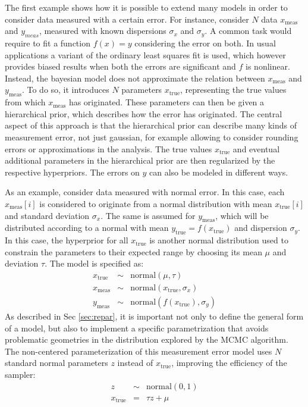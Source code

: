 The first example shows how it is possible to extend many models in order to consider data measured with a certain
error. For instance, consider $N$ data \(x_{\text{meas}}\) and $y_{meas}$, measured with known dispersions \(\sigma_x\) and
$\sigma_y$. A common task would require to fit a function $f(x)=y$ considering the error on both. In usual applications
a variant of the ordinary least squares fit is used, which however provides biased results when both the errors are significant and $f$ is nonlinear. 
Instead, the bayesian model does not approximate the relation between $x_{\text{meas}}$ and $y_{\text{meas}}$. To do so,
it introduces \(N\) parameters \(x_{\text{true}}\), representing the true values from which \(x_{\text{meas}}\) has originated. These parameters can then be given a hierarchical prior, which 
describes how the error has originated. 
The central aspect of this approach is that the hierarchical prior can describe many kinds of measurement error, not just gaussian, for example allowing to consider rounding errors or approximations in the analysis.
The true values \(x_{\text{true}}\) and eventual additional parameters in the hierarchical prior are then regularized by the respective hyperpriors. The errors on $y$ can also be modeled in different ways.

As an example, consider data measured with normal error. In this case, each \(x_{\text{meas}}[i]\) is considered to
originate from a normal distribution with mean \(x_{\text{true}}[i]\) and standard deviation $\sigma_x$. The same is
assumed for \(y_{\text{meas}}\), which will be distributed according to a normal with mean $y_{\text{true}}
=f(x_{\text{true}})$ and dispersion $\sigma_y$. In this case, the hyperprior for all \(x_{\text{true}}\) is another normal distribution used to constrain the parameters to their expected range by choosing its mean $\mu$ and deviation $\tau$. The model is specified as:
\begin{eqnarray}
x_{\text{true}} &\sim& \text{normal}(\mu, \tau)\\
x_{\text{meas}} &\sim& \text{normal}(x_{\text{true}}, \sigma_x)\\
y_{\text{meas}} &\sim &\text{normal}(f(x_{\text{true}}), \sigma_y)
\end{eqnarray}
As described in Sec \ref{sec:repar}, it is important not only to define the general form of a model, but also to
implement a specific parametrization that avoids problematic geometries in the distribution explored by the MCMC
algorithm. 
The non-centered parameterization of this measurement error model uses \(N\) standard normal parameters \(z\) instead of \(x_{\text{true}}\), improving the efficiency of the sampler:
\begin{eqnarray}
z &\sim& \text{normal}(0, 1) \\
x_{\text{true}} &= &\tau z + \mu
\end{eqnarray}

